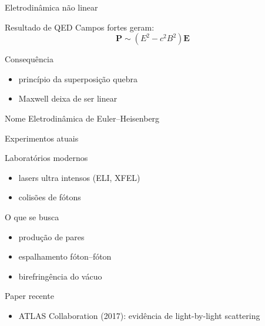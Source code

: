 \documentclass[aspectratio=169]{beamer}
\begin{document}

\begin{frame}{Eletrodinâmica não linear}

\begin{block}{Resultado de QED}
Campos fortes geram:
\begin{equation}
\mathbf{P} \sim (E^2 - c^2 B^2)\mathbf{E}
\end{equation}
\end{block}

\pause

\begin{block}{Consequência}
\begin{itemize}
\item princípio da superposição quebra
\item Maxwell deixa de ser linear
\end{itemize}
\end{block}

\pause

\begin{alertblock}{Nome}
Eletrodinâmica de Euler–Heisenberg
\end{alertblock}

\end{frame}


\begin{frame}{Experimentos atuais}

\begin{block}{Laboratórios modernos}
\begin{itemize}
\item lasers ultra intensos (ELI, XFEL)
\item colisões de fótons
\end{itemize}
\end{block}

\pause

\begin{block}{O que se busca}
\begin{itemize}
\item produção de pares
\item espalhamento fóton–fóton
\item birefringência do vácuo
\end{itemize}
\end{block}

\pause

\begin{alertblock}{Paper recente}
\begin{itemize}
\item ATLAS Collaboration (2017): evidência de light-by-light scattering
\end{itemize}
\end{alertblock}

\end{frame}
\end{document}
